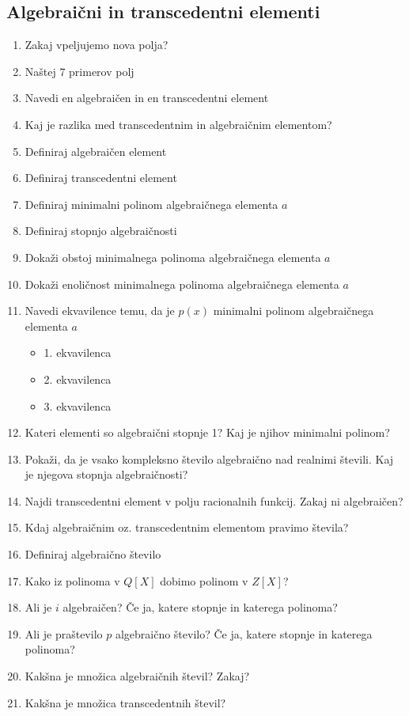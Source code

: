 \documentclass{article}
\begin{document}
    \subsection{Algebraični in transcedentni elementi}
    \begin{enumerate}
        \item Zakaj vpeljujemo nova polja?
        \item Naštej 7 primerov polj
        \item Navedi en algebraičen in en transcedentni element
        \item Kaj je razlika med transcedentnim in algebraičnim elementom?
        \item Definiraj algebraičen element
        \item Definiraj transcedentni element
        \item Definiraj minimalni polinom algebraičnega elementa $a$
        \item Definiraj stopnjo algebraičnosti
        \item Dokaži obstoj minimalnega polinoma algebraičnega elementa $a$
        \item Dokaži enoličnost minimalnega polinoma algebraičnega elementa $a$
        \item Navedi ekvavilence temu, da je $p(x)$ minimalni polinom algebraičnega elementa $a$
        \begin{itemize}
            \item 1. ekvavilenca
            \item 2. ekvavilenca
            \item 3. ekvavilenca
        \end{itemize}
        \item Kateri elementi so algebraični stopnje 1? Kaj je njihov minimalni polinom?
        \item Pokaži, da je vsako kompleksno število algebraično nad realnimi števili. Kaj je njegova stopnja algebraičnosti?
        \item Najdi transcedentni element v polju racionalnih funkcij. Zakaj ni algebraičen?
        \item Kdaj algebraičnim oz. transcedentnim elementom pravimo števila?
        \item Definiraj algebraično število
        \item Kako iz polinoma v $Q[X]$ dobimo polinom v $Z[X]$?
        \item Ali je $i$ algebraičen? Če ja, katere stopnje in katerega polinoma?
        \item Ali je praštevilo $p$ algebraično število? Če ja, katere stopnje in katerega polinoma?
        \item Kakšna je množica algebraičnih števil? Zakaj?
        \item Kakšna je množica transcedentnih števil?
    \end{enumerate}
\end{document}
